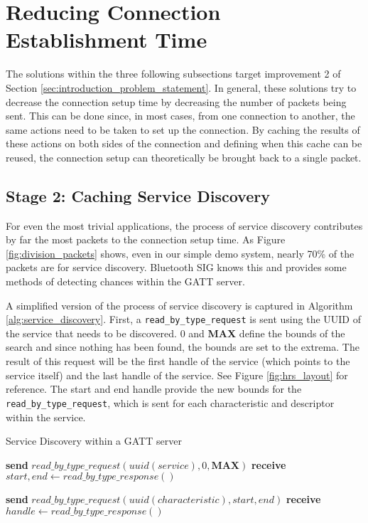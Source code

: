 \section{Reducing Connection Establishment Time}
The solutions within the three following subsections target improvement 2 of Section \ref{sec:introduction_problem_statement}. In general, these solutions try to decrease the connection setup time by decreasing the number of packets being sent. This can be done since, in most cases, from one connection to another, the same actions need to be taken to set up the connection. By caching the results of these actions on both sides of the connection and defining when this cache can be reused, the connection setup can theoretically be brought back to a single packet.

\subsection{Stage 2: Caching Service Discovery}
For even the most trivial applications, the process of service discovery contributes by far the most packets to the connection setup time. As Figure \ref{fig:division_packets} shows, even in our simple demo system, nearly 70\% of the packets are for service discovery. Bluetooth SIG knows this and provides some methods of detecting chances within the GATT server.

A simplified version of the process of service discovery is captured in Algorithm \ref{alg:service_discovery}. First, a \texttt{read\_by\_type\_request} is sent using the UUID of the service that needs to be discovered. 0 and \textbf{MAX} define the bounds of the search and since nothing has been found, the bounds are set to the extrema. The result of this request will be the first handle of the service (which points to the service itself) and the last handle of the service. See Figure \ref{fig:hrs_layout} for reference. The start and end handle provide the new bounds for the \texttt{read\_by\_type\_request}, which is sent for each characteristic and descriptor within the service.
\begin{algorithm}
    \caption{Service Discovery within a GATT server}
    \label{alg:service_discovery}
    \begin{algorithmic}[1] 
                \State \textbf{send} $\textit{read\_by\_type\_request}(\textit{uuid}(service), 0, \textbf{MAX})$
                \State \textbf{receive} $start,end \gets \textit{read\_by\_type\_response}()$

                    \State \textbf{send} $\textit{read\_by\_type\_request}(\textit{uuid}(characteristic), start, end)$
                    \State \textbf{receive} $handle \gets \textit{read\_by\_type\_response}()$
                \EndFor
            \EndFor
        \EndProcedure
    \end{algorithmic}
\end{algorithm}

